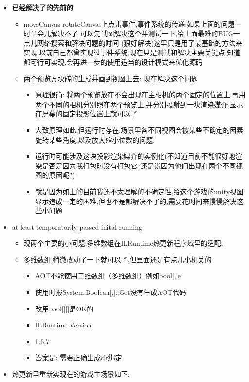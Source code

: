 \documentclass[9pt, b5paper]{article}
\begin{document}
\begin{itemize}
\item \textbf{已经解决了的先前的}
\begin{itemize}
\item moveCanvas rotateCanvas上点击事件,事件系统的传递.如果上面的问题一时半会儿解决不了,可以先试图解决这个并测试一下,给上面最难的BUG一点儿网络搜索和解决问题的时间 (狠好解决)这里只是用了最基础的方法来实现,以前自己都曾实现过事件系统,现在只是测试和解决主要关键点,知道都可行可实现,会再进一步的使用适当的设计模式来优化源码
\item 两个预览方块砖的生成并画到视图上去: 现在解决这个问题
\begin{itemize}
\item 原理很简: 将两个预览放在不会出现在主相机的两个固定的位置上;再用两个不同的相机分别照在两个预览上,并分别投射到一块渲染媒介,显示在屏幕的固定投影位置上就可以了
\item 大致原理如此,但运行时存在:场景里各不同视图会被某些不确定的因素旋转某些角度,以及放大缩小位数的问题.
\item 运行时可能涉及这块投影渲染媒介的实例化(不知道目前不能很好地渲染是否是因为我打包时没有打包它?还是说因为他们出现在两个不同视图的原因呢?)
\item 就是因为如上的目前我还不太理解的不确定性,给这个游戏的unity视图显示造成一定的困难,但也不是都解决不了的,需要花时间来慢慢解决这些小问题
\end{itemize}
\end{itemize}
\item at least temporatorily passed inital running 
\begin{itemize}
\item 现两个主要的小问题:多维数组在ILRuntime热更新程序域里的适配,
\item 多维数组,稍微改动了一下就可以了,但里面还是有点儿小机关的
\begin{itemize}
\item AOT不能使用二维数组（多维数组）例如bool[,]e
\item 使用时报System.Boolean[,]::Get没有生成AOT代码
\item 改用bool[][]是OK的
\item ILRuntime Version
\item 1.6.7
\item 答案是: 需要正确生成clr绑定
\end{itemize}
\end{itemize}
\item 热更新里重新实现在的游戏主场景如下:
\end{itemize}
\end{document}
